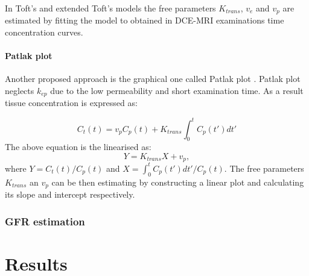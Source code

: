 In Toft's and extended Toft's models the free parameters $K_{trans}$, $v_e$ and $v_p$ are estimated by fitting the model to obtained in DCE-MRI examinations time concentration curves.  

\paragraph{Patlak plot}
Another proposed approach is the graphical one called Patlak plot \cite{patlak1983graphical}. Patlak plot neglects $k_{ep}$ due to the low permeability and short examination time. As a result tissue concentration is expressed as:

\begin{equation}
	\label{eq:patlak}
	C_{t}(t) =v_pC_p(t) + K_{trans}\int_{0}^{t}C_p(t')dt'  
\end{equation}
The above equation is the linearised as:
\begin{equation}
	\label{eq:patlak_lin}
	Y = K_{trans}X +v_p,  
\end{equation}
where $Y=C_t(t)/C_p(t)$ and $X=\int_{0}^{t}C_p(t')dt'/C_p(t)$. The free parameters $K_{trans}$ an $v_p$ can be then estimating by constructing a linear plot and calculating its slope and intercept respectively.


\subsubsection{GFR estimation}

\section{Results}



